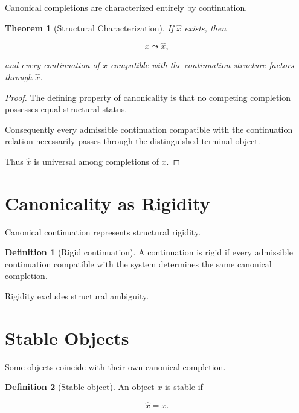 \documentclass[13pt,openany]{book}
\theoremstyle{plain}
\newtheorem{theorem}{Theorem}[chapter]
\theoremstyle{definition}
\newtheorem{definition}{Definition}[chapter]
\begin{document}
Canonical completions are characterized entirely by continuation.

\begin{theorem}[Structural Characterization]
If $\widehat{x}$ exists, then

\[
x\leadsto\widehat{x},
\]

and every continuation of $x$ compatible with the continuation structure factors
through $\widehat{x}$.
\end{theorem}

\begin{proof}
The defining property of canonicality is that no competing completion possesses
equal structural status.

Consequently every admissible continuation compatible with the continuation
relation necessarily passes through the distinguished terminal object.

Thus $\widehat{x}$ is universal among completions of $x$.
\end{proof}


\section{Canonicality as Rigidity}

Canonical continuation represents structural rigidity.

\begin{definition}[Rigid continuation]
A continuation is rigid if every admissible continuation compatible with the
system determines the same canonical completion.
\end{definition}

Rigidity excludes structural ambiguity.


\section{Stable Objects}

Some objects coincide with their own canonical completion.

\begin{definition}[Stable object]
An object $x$ is stable if

\[
\widehat{x}=x.
\]
\end{definition}
\end{document}
